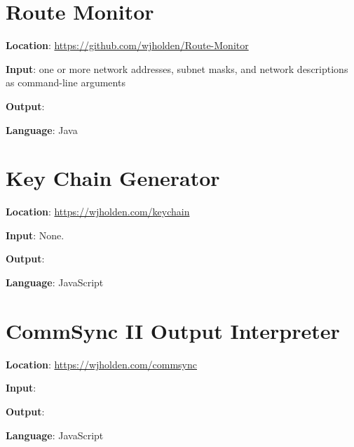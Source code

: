 \documentclass[12pt]{article}
\begin{document}
\section{Route Monitor}

\textbf{Location}: \url{https://github.com/wjholden/Route-Monitor}

\textbf{Input}: one or more network addresses, subnet masks, and network descriptions as command-line arguments

\textbf{Output}: 

\textbf{Language}: Java


\section{Key Chain Generator}

\textbf{Location}: \url{https://wjholden.com/keychain}

\textbf{Input}: None.

\textbf{Output}: 

\textbf{Language}: JavaScript



\section{CommSync II Output Interpreter}

\textbf{Location}: \url{https://wjholden.com/commsync}

\textbf{Input}: 

\textbf{Output}: 

\textbf{Language}: JavaScript
\end{document}
